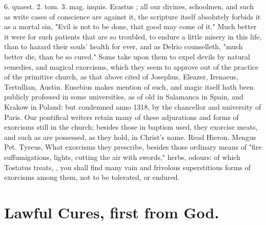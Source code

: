 {{{6. quaest. 2. tom. 3. mag. inquis.}} Erastus ;
all our divines, schoolmen, and such as write cases of
conscience are against it, the scripture itself absolutely forbids it as a
mortal sin,  \etc{}  "Evil is not to be done, that
good may come of it." Much better it were for such patients that are so
troubled, to endure a little misery in this life, than to hazard their souls'
health for ever, and as Delrio counselleth, "much better
die, than be so cured." Some take upon them to expel devils by natural
remedies, and magical exorcisms, which they seem to approve out of the practice
of the primitive church, as that above cited of Josephus, Eleazer, Irenaeus,
Tertullian, Austin. Eusebius makes mention of such, and magic itself hath been
publicly professed in some universities, as of old in Salamanca in Spain, and
Krakow in Poland: but condemned anno 1318, by the chancellor and university of
Paris. Our pontifical writers retain many of these
adjurations and forms of exorcisms still in the church; besides those in
baptism used, they exorcise meats, and such as are possessed, as they hold, in
Christ's name. Read Hieron. Mengus  Pet. Tyreus,
 What exorcisms they prescribe, besides
those ordinary means of "fire suffumigations, lights,
cutting the air with swords,"  herbs, odours: of
which Tostatus treats, , you
shall find many vain and frivolous superstitious forms of exorcisms among them,
not to be tolerated, or endured.


\section{Lawful Cures, first from God.}

}
